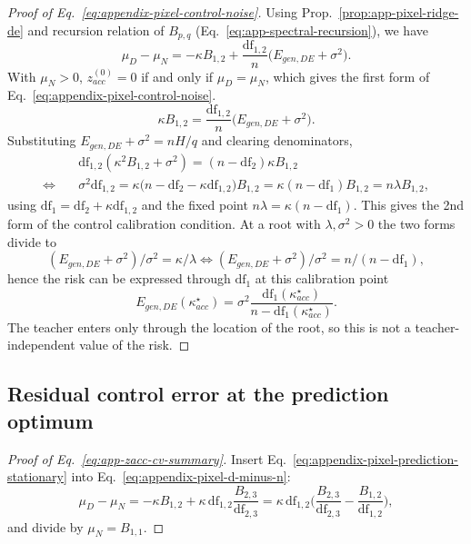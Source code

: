 \begin{proof}[Proof of Eq.~\ref{eq:appendix-pixel-control-noise}]
Using Prop.~\ref{prop:app-pixel-ridge-de} and recursion relation of $B_{p,q}$ (Eq.~\ref{eq:app-spectral-recursion}), we have 
\begin{equation}
\mu_D-\mu_N=-\kappa B_{1,2}+\frac{\mathrm{df}_{1,2}}{n}\big(E_{gen,DE}+\sigma^2\big).
\label{eq:appendix-pixel-d-minus-n}
\end{equation}
With $\mu_N>0$, $z^{(0)}_{acc}=0$ if and only if $\mu_D=\mu_N$, which gives the first form of Eq.~\ref{eq:appendix-pixel-control-noise}. 
\[
\kappa B_{1,2}=\frac{\mathrm{df}_{1,2}}{n}\big(E_{gen,DE}+\sigma^2\big).
\]
Substituting $E_{gen,DE}+\sigma^2=nH/q$ and clearing denominators,
\[
\begin{aligned}
&\mathrm{df}_{1,2}(\kappa^2B_{1,2}+\sigma^2)=(n-\mathrm{df}_2)\kappa B_{1,2}\\
\Longleftrightarrow\quad
&\sigma^2\mathrm{df}_{1,2}=\kappa\big(n-\mathrm{df}_2-\kappa\mathrm{df}_{1,2}\big)B_{1,2}
=\kappa(n-\mathrm{df}_1)B_{1,2}=n\lambda B_{1,2},
\end{aligned}
\]
using $\mathrm{df}_1=\mathrm{df}_2+\kappa\mathrm{df}_{1,2}$ and the fixed
point $n\lambda=\kappa(n-\mathrm{df}_1)$. This gives the 2nd form of the control calibration condition. 
At a root with $\lambda,\sigma^2>0$ the two forms divide to
\[
(E_{gen,DE}+\sigma^2)/\sigma^2=\kappa/\lambda\Longleftrightarrow(E_{gen,DE}+\sigma^2)/\sigma^2=n/(n-\mathrm{df}_1),
\]
hence the risk can be expressed through $\mathrm{df}_1$ at this calibration point
\begin{equation}
E_{gen,DE}(\kappa^\star_{acc})=\sigma^2\frac{\mathrm{df}_1(\kappa^\star_{acc})}{n-\mathrm{df}_1(\kappa^\star_{acc})} .
\label{eq:appendix-pixel-risk-at-control}
\end{equation}
The teacher enters only through the location of the root, so this is not a
teacher-independent value of the risk.
\end{proof}

\subsection{Residual control error at the prediction optimum}

\begin{proof}[Proof of Eq.~\ref{eq:app-zacc-cv-summary}]
Insert Eq.~\ref{eq:appendix-pixel-prediction-stationary} into
Eq.~\ref{eq:appendix-pixel-d-minus-n}:
\[
\mu_D-\mu_N=-\kappa B_{1,2}+\kappa\,\mathrm{df}_{1,2}\frac{B_{2,3}}{\mathrm{df}_{2,3}}
=\kappa\,\mathrm{df}_{1,2}\Big(\frac{B_{2,3}}{\mathrm{df}_{2,3}}-\frac{B_{1,2}}{\mathrm{df}_{1,2}}\Big),
\]
and divide by $\mu_N=B_{1,1}$.
\end{proof}

